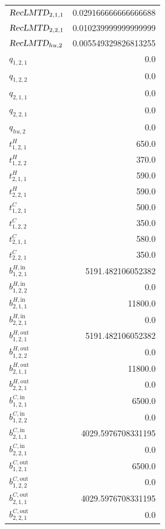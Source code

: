 \documentclass{article}%
\begin{document}
\begin{multicols*}{3}
\begin{supertabular}{lr}
	$\textsl{RecLMTD}_{2,1,1}$ & 0.029166666666666688 \\%
	$\textsl{RecLMTD}_{2,2,1}$ & 0.010239999999999999 \\%
	$\textsl{RecLMTD}_{hu,2}$ & 0.005549329826813255 \\%
	$q_{1,2,1}$ & 0.0 \\%
	$q_{1,2,2}$ & 0.0 \\%
	$q_{2,1,1}$ & 0.0 \\%
	$q_{2,2,1}$ & 0.0 \\%
	$q_{hu,2}$ & 0.0 \\%
	$t_{1,2,1}^{H}$ & 650.0 \\%
	$t_{1,2,2}^{H}$ & 370.0 \\%
	$t_{2,1,1}^{H}$ & 590.0 \\%
	$t_{2,2,1}^{H}$ & 590.0 \\%
	$t_{1,2,1}^{C}$ & 500.0 \\%
	$t_{1,2,2}^{C}$ & 350.0 \\%
	$t_{2,1,1}^{C}$ & 580.0 \\%
	$t_{2,2,1}^{C}$ & 350.0 \\%
	$b_{1,2,1}^{H,\text{in}}$ & 5191.482106052382 \\%
	$b_{1,2,2}^{H,\text{in}}$ & 0.0 \\%
	$b_{2,1,1}^{H,\text{in}}$ & 11800.0 \\%
	$b_{2,2,1}^{H,\text{in}}$ & 0.0 \\%
	$b_{1,2,1}^{H,\text{out}}$ & 5191.482106052382 \\%
	$b_{1,2,2}^{H,\text{out}}$ & 0.0 \\%
	$b_{2,1,1}^{H,\text{out}}$ & 11800.0 \\%
	$b_{2,2,1}^{H,\text{out}}$ & 0.0 \\%
	$b_{1,2,1}^{C,\text{in}}$ & 6500.0 \\%
	$b_{1,2,2}^{C,\text{in}}$ & 0.0 \\%
	$b_{2,1,1}^{C,\text{in}}$ & 4029.5976708331195 \\%
	$b_{2,2,1}^{C,\text{in}}$ & 0.0 \\%
	$b_{1,2,1}^{C,\text{out}}$ & 6500.0 \\%
	$b_{1,2,2}^{C,\text{out}}$ & 0.0 \\%
	$b_{2,1,1}^{C,\text{out}}$ & 4029.5976708331195 \\%
	$b_{2,2,1}^{C,\text{out}}$ & 0.0 \\%
\end{supertabular}%
\end{multicols*}%
\end{document}
